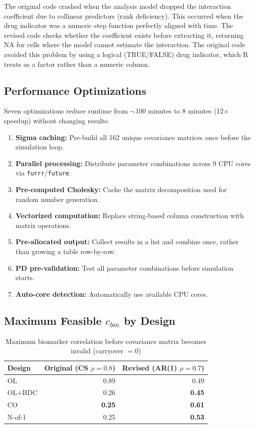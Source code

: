 \documentclass[11pt]{article}
\begin{document}
The original code crashed when the analysis model dropped the
interaction coefficient due to collinear predictors (rank
deficiency). This occurred when the drug indicator was a
numeric step function perfectly aligned with time. The revised
code checks whether the coefficient exists before extracting
it, returning NA for cells where the model cannot estimate the
interaction. The original code avoided this problem by using a
logical (TRUE/FALSE) drug indicator, which R treats as a
factor rather than a numeric column.

\subsection{Performance Optimizations}

Seven optimizations reduce runtime from $\sim$100 minutes to
8 minutes (12$\times$ speedup) without changing results:

\begin{enumerate}[nosep]
\item \textbf{Sigma caching:} Pre-build all 162 unique
  covariance matrices once before the simulation loop.
\item \textbf{Parallel processing:} Distribute parameter
  combinations across 9 CPU cores via
  \texttt{furrr}/\texttt{future}.
\item \textbf{Pre-computed Cholesky:} Cache the matrix
  decomposition used for random number generation.
\item \textbf{Vectorized computation:} Replace string-based
  column construction with matrix operations.
\item \textbf{Pre-allocated output:} Collect results in a
  list and combine once, rather than growing a table
  row-by-row.
\item \textbf{PD pre-validation:} Test all parameter
  combinations before simulation starts.
\item \textbf{Auto-core detection:} Automatically use
  available CPU cores.
\end{enumerate}

\subsection{Maximum Feasible $c_{bm}$ by Design}

\begin{table}[h]
\centering
\caption{Maximum biomarker correlation before covariance
  matrix becomes invalid (carryover $= 0$)}
\begin{tabular}{lrr}
\toprule
Design & Original (CS $\rho = 0.8$) &
  Revised (AR(1) $\rho = 0.7$) \\
\midrule
OL & 0.89 & 0.49 \\
OL+BDC & 0.26 & \textbf{0.45} \\
CO & \textbf{0.25} & \textbf{0.61} \\
N-of-1 & 0.25 & \textbf{0.53} \\
\bottomrule
\end{tabular}
\end{table}
\end{document}
